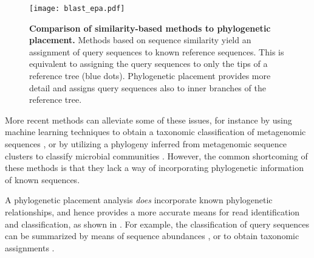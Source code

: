 \begin{figure}[hpbt]
    \centering
    \texttt{[image: blast\_epa.pdf]}
    \begin{subfigure}{0pt}
        \label{fig:blast_epa:sub:blast}
    \end{subfigure}
    \begin{subfigure}{0pt}
        \label{fig:blast_epa:sub:epa}
    \end{subfigure}
    \caption[Comparison of similarity-based methods to phylogenetic placement]{
        \textbf{Comparison of similarity-based methods to phylogenetic placement.}
        Methods based on sequence similarity yield an assignment of query sequences to known reference sequences.
        This is equivalent to assigning the query sequences to only the tips of a reference tree (blue dots).
        Phylogenetic placement provides more detail
        and assigns query sequences also to inner branches of the reference tree.
    }
    \label{fig:blast_epa}
\end{figure}

More recent methods can alleviate some of these issues, for instance by
using machine learning techniques to obtain a taxonomic classification of metagenomic sequences \cite{Vervier2015},
or by utilizing a phylogeny inferred from metagenomic sequence clusters to classify microbial communities \cite{Tanaseichuk2014}.
However, the common shortcoming of these methods is
that they lack a way of incorporating phylogenetic information of known sequences.

A phylogenetic placement analysis \emph{does} incorporate known phylogenetic relationships,
and hence provides a more accurate means for read identification and classification,
as shown in .
For example, the classification of query sequences
can be summarized by means of sequence abundances \cite{Pace1997,Hugenholtz1998},
or to obtain taxonomic assignments \cite{Nguyen2014,Kozlov2016}.

